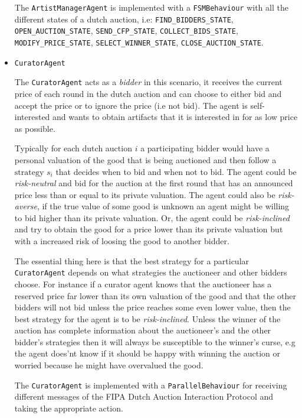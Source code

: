 \documentclass[a4paper, 11pt]{article}
\begin{document}
\begin{itemize}
The \texttt{ArtistManagerAgent} is implemented with a \texttt{FSMBehaviour} with all the different states of a dutch auction, i.e: \texttt{FIND\_BIDDERS\_STATE}, \texttt{OPEN\_AUCTION\_STATE}, \texttt{SEND\_CFP\_STATE}, \texttt{COLLECT\_BIDS\_STATE}, \texttt{MODIFY\_PRICE\_STATE}, \texttt{SELECT\_WINNER\_STATE}, \texttt{CLOSE\_AUCTION\_STATE}.

\item \texttt{CuratorAgent}

The \texttt{CuratorAgent} acts as a \textit{bidder} in this scenario, it receives the current price of each round in the dutch auction and can choose to either bid and accept the price or to ignore the price (i.e not bid). The agent is self-interested and wants to obtain artifacts that it is interested in for as low price as possible. 

Typically for each dutch auction $i$ a participating bidder would have a personal valuation of the good that is being auctioned and then follow a $\text{strategy }s_i$ that decides when to bid and when not to bid. The agent could be \textit{risk-neutral} and bid for the auction at the first round that has an announced price less than or equal to its private valuation. The agent could also be \textit{risk-averse}, if the true value of some good is unknown an agent might be willing to bid higher than its private valuation. Or, the agent could be \textit{risk-inclined} and try to obtain the good for a price lower than its private valuation but with a increased risk of loosing the good to another bidder. 

The essential thing here is that the best strategy for a particular \texttt{CuratorAgent} depends on what strategies the auctioneer and other bidders choose. For instance if a curator agent knows that the auctioneer has a reserved price far lower than its own valuation of the good and that the other bidders will not bid unless the price reaches some even lower value, then the best strategy for the agent is to be \textit{risk-inclined}. Unless the winner of the auction has complete information about the auctioneer's and the other bidder's strategies then it will always be susceptible to the winner's curse, e.g the agent does'nt know if it should be happy with winning the auction or worried because he might have overvalued the good.

The \texttt{CuratorAgent} is implemented with a \texttt{ParallelBehaviour} for receiving different messages of the FIPA Dutch Auction Interaction Protocol and taking the appropriate action.

\end{itemize}
\end{document}
